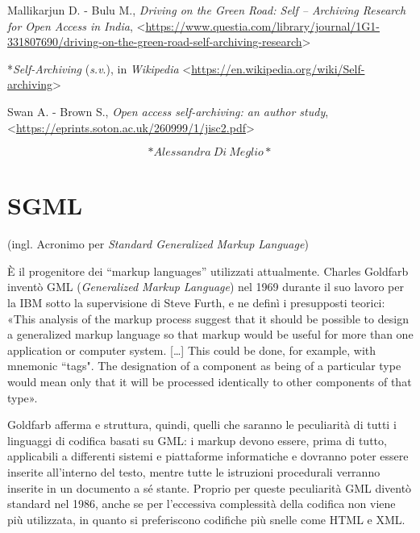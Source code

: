 \documentclass[
  b5paper,
  twoside,
  12pt,
  chapterprefix=false,
  bibliography=totocnumbered,
  parskip=false]{scrbook}
\begin{document}
Mallikarjun D. - Bulu M., \emph{Driving on the Green Road: Self -- Archiving
Research for Open Access in India},
\textless{}\href{https://www.questia.com/library/journal/1G1-331807690/driving-on-the-green-road-self-archiving-research}{{https://www.questia.com/library/journal/1G1-331807690/driving-on-the-green-road-self-archiving-research}}\textgreater{}

*\emph{Self-Archiving} (\emph{s.v}.), in \emph{Wikipedia}
\textless{}\href{https://en.wikipedia.org/wiki/Self-archiving}{{https://en.wikipedia.org/wiki/Self-archiving}}\textgreater{}

Swan A. - Brown S., \emph{Open access self-archiving: an author study},
\textless{}\href{https://eprints.soton.ac.uk/260999/1/jisc2.pdf}{{https://eprints.soton.ac.uk/260999/1/jisc2.pdf}}\textgreater{}

\[*Alessandra~Di~Meglio*\]

\hypertarget{sgml}{%
\chapter{SGML}\label{sgml}}

(ingl. Acronimo per \emph{Standard Generalized Markup Language})

È il progenitore dei \enquote{markup languages} utilizzati attualmente. Charles
Goldfarb inventò GML (\emph{Generalized Markup Language}) nel 1969 durante il
suo lavoro per la IBM sotto la supervisione di Steve Furth, e ne definì
i presupposti teorici: «This analysis of the markup process suggest that
it should be possible to design a generalized markup language so that
markup would be useful for more than one application or computer system.
{[}\ldots{]} This could be done, for example, with mnemonic ``tags". The
designation of a component as being of a particular type would mean only
that it will be processed identically to other components of that type».

Goldfarb afferma e struttura, quindi, quelli che saranno le peculiarità
di tutti i linguaggi di codifica basati su GML: i markup devono essere,
prima di tutto, applicabili a differenti sistemi e piattaforme
informatiche e dovranno poter essere inserite all'interno del testo,
mentre tutte le istruzioni procedurali verranno inserite in un documento
a sé stante. Proprio per queste peculiarità GML diventò standard nel
1986, anche se per l'eccessiva complessità della codifica non viene più
utilizzata, in quanto si preferiscono codifiche più snelle come HTML e
XML.
\end{document}
